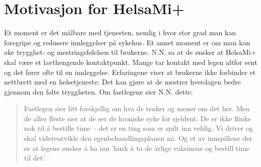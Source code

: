 \section{Motivasjon for HelsaMi+}
Et moment er det målbare med tjenesten, nemlig i hvor stor grad man kan foregripe og redusere innleggelser på sykehus. Et annet moment er om man kan
øke trygghet- og mestringsfølelsen til brukerne. N.N. sa at de ønsker at HelsaMi+ skal være et lavthengende kontaktpunkt. Mange tar kontakt
med legen altfor sent og det fører ofte til en innleggelse. Erfaringene viser at brukerne ikke forbinder et nettbrett med en
helsetjeneste:  Det kan gjøre at de mestrer
hverdagen bedre gjennom den følte tryggheten. Om fastlegene sier N.N. dette: \blockquote{Fastlegen sier litt forskjellig om hva de tenker og mener
om det her. Men de aller fleste sier at de ser de kroniske syke for sjeldent. De er ikke flinke nok til å bestille time -- det
er en ting som er spilt inn veldig. Vi driver og skal videreutvikle den
egenbehandlingsplanen nå. Og et av innspillene der er at legene ønsker å ha inn 'husk å ta de årlige vaksinene og bestill time til det'.}

